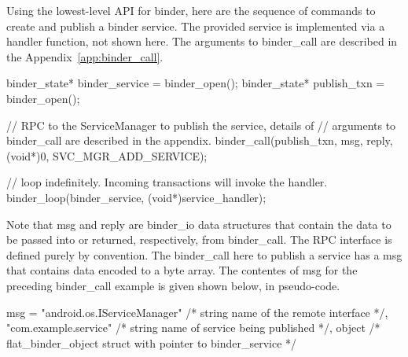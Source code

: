 \documentclass[prodmode]{acmlarge}
\begin{document}
Using the lowest-level API for binder, here are the sequence of commands to create and publish a binder service. The provided service is implemented via a handler function, not shown here. The arguments to binder\_call are described in the Appendix~\ref{app:binder_call}.

\begin{snippet}[label=snip:binder_call,caption=binder\_call to publish a service with ServiceManager]
binder_state* binder_service = binder_open();
binder_state* publish_txn = binder_open();

// RPC to the ServiceManager to publish the  service, details of
// arguments to binder_call  are described in the appendix.
binder_call(publish_txn, msg, reply, (void*)0, SVC_MGR_ADD_SERVICE);

// loop indefinitely. Incoming transactions  will invoke the handler.
binder_loop(binder_service, (void*)service_handler);
\end{snippet}

Note that msg and reply are binder\_io data structures that contain the data to be passed into or returned, respectively, from binder\_call. The RPC interface is defined purely by convention. The binder\_call here to publish a service has a msg that contains data encoded to a byte array. The contentes of msg for the preceding binder\_call example is given shown below, in pseudo-code.

\begin{snippet}[caption=contents of msg passed into binder\_call]
msg = {
  "android.os.IServiceManager" /* string name of the remote interface */,
  "com.example.service" /* string name of service being published */,
  object /* flat_binder_object struct with pointer to binder_service */
}
\end{snippet}
\end{document}
